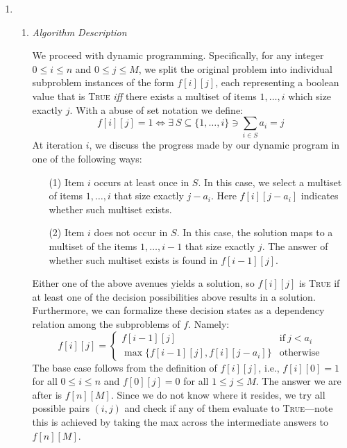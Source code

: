 \documentclass[10pt, letterpaper]{article}
\begin{document}
\begin{enumerate}[label={\bfseries Q\arabic*.}]
  \item
    \begin{enumerate}
      \item
        {\itshape Algorithm Description} \\ \vspace{-4mm}

        We proceed with dynamic programming. Specifically, for any integer $0 \leq i \leq n$ and $0 \leq j
        \leq M$, we split the original problem into individual subproblem instances of the form $f[i][j]$,
        each representing a boolean value that is \textsc{True} \textit{iff} there exists a multiset of
        items $1, \ldots, i$ which size exactly $j$. With a abuse of set notation we define:
        \[
          f[i][j] = 1 \iff \exists\ S \subseteq \{1, \ldots, i\} \ni \sum_{i \in S} a_i = j
        \]
        At iteration $i$, we discuss the progress made by our dynamic program in one of the following ways:
        \begin{itemize}
          \item[(1)]
            Item $i$ occurs at least once in $S$. In this case, we select a multiset of items $1, \ldots, i$
            that size exactly $j-a_i$. Here $f[i][j-a_i]$ indicates whether such multiset exists.

          \item[(2)]
            Item $i$ does not occur in $S$. In this case, the solution maps to a multiset of the items $1,
            \ldots, i-1$ that size exactly $j$. The answer of whether such multiset exists is found in $f[i
            -1][j]$.
        \end{itemize}

        Either one of the above avenues yields a solution, so $f[i][j]$ is \textsc{True} if at least one of
        the decision possibilities above results in a solution. Furthermore, we can formalize these decision
        states as a dependency relation among the subproblems of $f$. Namely:
        \[
          f[i][j] = \begin{cases}f[i-1][j] & \text{if}\ j < a_i \\ \max\big\{f[i-1][j], f[i][j-a_i]\big\} &
            \text{otherwise} \end{cases}
        \]
        The base case follows from the definition of $f[i][j]$, i.e., $f[i][0] = 1$ for all $0 \leq i
        \leq n$ and $f[0][j] = 0$ for all $1 \leq j \leq M$. The answer we are after is $f[n][M]$. Since we
        do not know where it resides, we try all possible pairs $(i,j)$ and check if any of them evaluate to
        \textsc{True}---note this is achieved by taking the max across the intermediate answers to $f[n][M]$.
        \\


\end{enumerate}
\end{enumerate}
\end{document}
